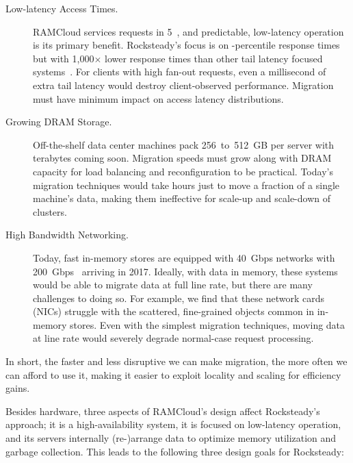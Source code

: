 \begin{description}
\item[Low-latency Access Times.]
RAMCloud services requests in 5~\us, and predictable, low-latency operation is
its primary benefit.  Rocksteady's focus is on \nnnth{}-percentile response
times but with 1,000$\times$ lower response times than other tail latency
focused systems~\cite{dynamo}. For clients with high fan-out requests, even
a millisecond of extra tail latency would destroy client-observed
performance. Migration must have minimum impact on access latency
distributions.

\item[Growing DRAM Storage.]
Off-the-shelf data center machines pack 256~to~512~GB per server
with terabytes coming soon. Migration speeds must
grow along with DRAM capacity for load balancing and reconfiguration to be
practical. Today's migration techniques would take hours
just to move a fraction of a single machine's data, making them ineffective for
scale-up and scale-down of clusters.

\item[High Bandwidth Networking.]
Today, fast in-memory stores are equipped with 40~Gbps networks with
200~Gbps~\cite{mellanox-cx6} arriving in 2017. Ideally, with data in memory, these
systems would be able to migrate data at full line rate, but there are many
challenges to doing so.  For example, we find that these network cards (NICs)
struggle with the scattered, fine-grained objects common in in-memory
stores.  Even with the simplest migration
techniques, moving data at line rate would severely degrade
normal-case request processing.

\end{description}

\noindent
In short, the faster and less disruptive we can make migration, the more often we can
afford to use it, making it easier to exploit locality and scaling for efficiency gains.

Besides hardware, three aspects of RAMCloud's design affect Rocksteady's
approach; it is a high-availability system, it is focused on low-latency
operation, and its servers internally (re-)arrange data to optimize memory
utilization and garbage collection. This leads to the following three design
goals for Rocksteady:

